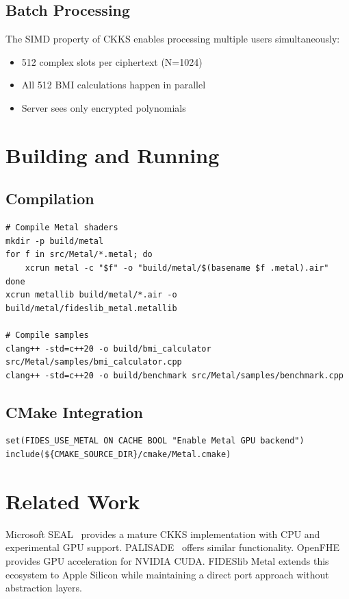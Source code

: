 \documentclass[11pt,oneside]{article}
\begin{document}
\subsection{Batch Processing}

The SIMD property of CKKS enables processing multiple users simultaneously:
\begin{itemize}
    \item 512 complex slots per ciphertext (N=1024)
    \item All 512 BMI calculations happen in parallel
    \item Server sees only encrypted polynomials
\end{itemize}

\section{Building and Running}

\subsection{Compilation}

\begin{verbatim}
# Compile Metal shaders
mkdir -p build/metal
for f in src/Metal/*.metal; do
    xcrun metal -c "$f" -o "build/metal/$(basename $f .metal).air"
done
xcrun metallib build/metal/*.air -o build/metal/fideslib_metal.metallib

# Compile samples
clang++ -std=c++20 -o build/bmi_calculator src/Metal/samples/bmi_calculator.cpp
clang++ -std=c++20 -o build/benchmark src/Metal/samples/benchmark.cpp
\end{verbatim}

\subsection{CMake Integration}

\begin{verbatim}
set(FIDES_USE_METAL ON CACHE BOOL "Enable Metal GPU backend")
include(${CMAKE_SOURCE_DIR}/cmake/Metal.cmake)
\end{verbatim}

\section{Related Work}

Microsoft SEAL~\cite{seal} provides a mature CKKS implementation with CPU and experimental GPU support. PALISADE~\cite{palisade} offers similar functionality. OpenFHE~\cite{openfhe} provides GPU acceleration for NVIDIA CUDA. FIDESlib Metal extends this ecosystem to Apple Silicon while maintaining a direct port approach without abstraction layers.
\end{document}
